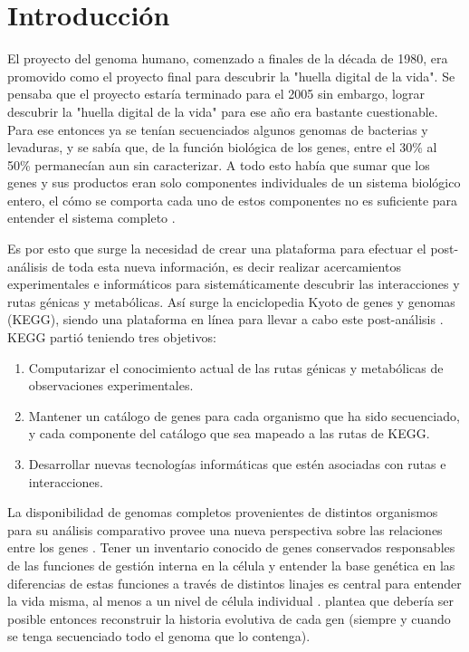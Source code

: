 \section{Introducción}

El proyecto del genoma humano, comenzado a finales de la década de 1980, era promovido como el proyecto final para descubrir la "huella digital de la vida". Se pensaba que el proyecto estaría terminado para el 2005 sin embargo, lograr descubrir la "huella digital de la vida" para ese año era bastante cuestionable. Para ese entonces ya se tenían secuenciados algunos genomas de bacterias y levaduras, y se sabía que, de la función biológica de los genes, entre el 30\% al 50\% permanecían aun sin caracterizar. A todo esto había que sumar que los genes y sus productos eran solo componentes individuales de un sistema biológico entero, el cómo se comporta cada uno de estos componentes no es suficiente para entender el sistema completo \parencite{Kanehisa_1997}.

Es por esto que surge la necesidad de crear una plataforma para efectuar el post-análisis de toda esta nueva información, es decir realizar acercamientos experimentales e informáticos para sistemáticamente descubrir las interacciones y rutas génicas y metabólicas. Así surge la enciclopedia Kyoto de genes y genomas (KEGG), siendo una plataforma en línea para llevar a cabo este post-análisis \parencite{Kanehisa_1997}. KEGG partió teniendo tres objetivos:
\begin{enumerate}
	\item Computarizar el conocimiento actual de las rutas génicas y metabólicas de observaciones experimentales.
	\item Mantener un catálogo de genes para cada organismo que ha sido secuenciado, y cada componente del catálogo que sea mapeado a las rutas de KEGG.
	\item Desarrollar nuevas tecnologías informáticas que estén asociadas con rutas e interacciones. 
\end{enumerate}

La disponibilidad de genomas completos provenientes de distintos organismos para su análisis comparativo provee una nueva perspectiva sobre las relaciones entre los genes \parencite{Koonin_2005}. Tener un inventario conocido de genes conservados responsables de las funciones de gestión interna en la célula y entender la base genética en las diferencias de estas funciones a través de distintos linajes es central para entender la vida misma, al menos a un nivel de célula individual \parencite{Tatusov_1997}. \textcite{Koonin_2005} plantea que debería ser posible entonces reconstruir la historia evolutiva de cada gen (siempre y cuando se tenga secuenciado todo el genoma que lo contenga). 

